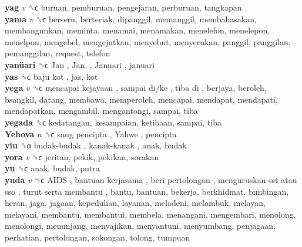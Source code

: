 \textbf{yag} \emph{v}  ␝ϲ  buruan, pemburuan, pengejaran, perburuan, tangkapan  \\
\textbf{yama} \emph{v}  ␝ϲ  berseru, berteriak, dipanggil, memanggil, membahasakan, membangunkan, meminta, menamai, menamakan, menelefon, menelepon, menelpon, mengebel, mengejutkan, menyebut, menyerukan, panggil, panggilan, pemanggilan, request, telefon  \\
\textbf{yanüari} ␝ϲ   Jan ,  Jan. ,  Januari , januari  \\
\textbf{yas} ␝ϲ   baju kot , jas, kot  \\
\textbf{yega} \emph{v}  ␝ϲ   mencapai kejayaan ,  sampai di/ke ,  tiba di , berjaya, beroleh, bsangkil, datang, membawa, memperoleh, mencapai, mendapat, mendapati, mendapatkan, mengambil, mengantongi, sampai, tiba  \\
\textbf{yegada} ␝ϲ  kedatangan, kesampaian, ketibaan, sampai, tiba  \\
\textbf{Yehova} \emph{n}  ␝ϲ   sang pencipta ,  Yahwe , pencipta  \\
\textbf{yiu} ␝α   budak-budak ,  kanak-kanak , anak, budak  \\
\textbf{yora} \emph{v}  ␝ϲ  jeritan, pekik, pekikan, sorakan  \\
\textbf{yu} ␝ϲ  anak, budak, putra  \\
\textbf{yuda} \emph{v}  ␝ϲ   AIDS ,  bantuan kerjasama ,  beri pertolongan ,  menguruskan sst atau sso ,  turut serta membantu , bantu, bantuan, bekerja, berkhidmat, bimbingan, heran, jaga, jagaan, kepedulian, layanan, meladeni, melambuk, melayan, melayani, membantu, membantui, membela, menangani, mengembari, menolong, menolongi, menunjang, menyajikan, menyantuni, menyumbang, penjagaan, perhatian, pertolongan, sokongan, tolong, tumpuan  \\
